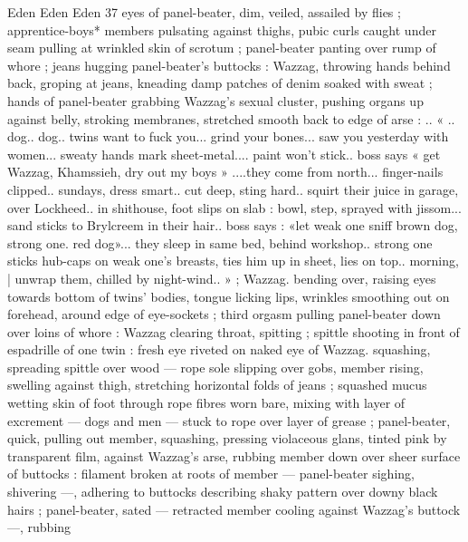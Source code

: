 Eden Eden Eden 37
eyes of panel-beater, dim, veiled, assailed by flies ; apprentice-boys*
members pulsating against thighs, pubic curls caught under seam
pulling at wrinkled skin of scrotum ; panel-beater panting over rump
of whore ; jeans hugging panel-beater's buttocks : Wazzag, throwing
hands behind back, groping at jeans, kneading damp patches of
denim soaked with sweat ; hands of panel-beater grabbing Wazzag's
sexual cluster, pushing organs up against belly, stroking membranes,
stretched smooth back to edge of arse : .. « .. dog.. dog.. twins want
to fuck you... grind your bones... saw you yesterday with women...
sweaty hands mark sheet-metal.... paint won't stick.. boss says « get
Wazzag, Khamssieh, dry out my boys » ....they come from north...
finger-nails clipped.. sundays, dress smart.. cut deep, sting hard..
squirt their juice in garage, over Lockheed.. in shithouse, foot slips
on slab : bowl, step, sprayed with jissom... sand sticks to Brylcreem
in their hair.. boss says : «let weak one sniff brown dog, strong one.
red dog»... they sleep in same bed, behind workshop.. strong one
sticks hub-caps on weak one's breasts, ties him up in sheet, lies on
top.. morning, | unwrap them, chilled by night-wind.. » ; Wazzag.
bending over, raising eyes towards bottom of twins’ bodies, tongue
licking lips, wrinkles smoothing out on forehead, around edge of
eye-sockets ; third orgasm pulling panel-beater down over loins of
whore : Wazzag clearing throat, spitting ; spittle shooting in front of
espadrille of one twin : fresh eye riveted on naked eye of Wazzag.
squashing, spreading spittle over wood — rope sole slipping over
gobs, member rising, swelling against thigh, stretching horizontal
folds of jeans ; squashed mucus wetting skin of foot through rope
fibres worn bare, mixing with layer of excrement — dogs and men
— stuck to rope over layer of grease ; panel-beater, quick, pulling
out member, squashing, pressing violaceous glans, tinted pink by
transparent film, against Wazzag's arse, rubbing member down over
sheer surface of buttocks : filament broken at roots of member —
panel-beater sighing, shivering —, adhering to buttocks describing
shaky pattern over downy black hairs ; panel-beater, sated —
retracted member cooling against Wazzag's buttock —, rubbing

